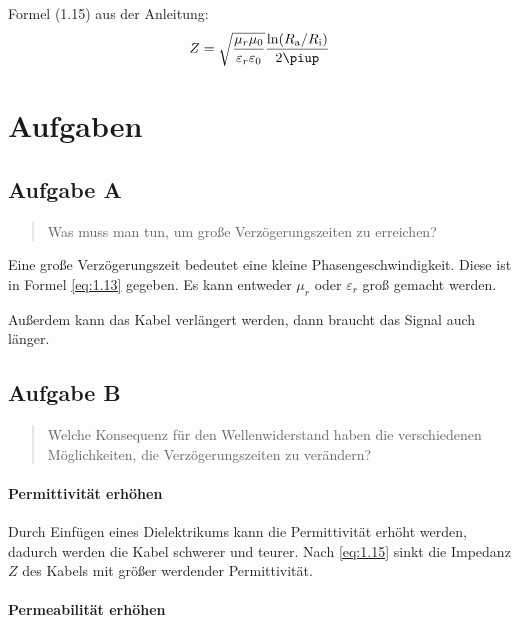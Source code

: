 Formel (1.15) aus der Anleitung:
\begin{equation}
	\label{eq:1.15}
	Z = \sqrt{\frac{\mu_r \mu_0}{\varepsilon_r \varepsilon_0}} \frac{\ln(R_\text a/R_\text i)}{2\piup}
\end{equation}


\section{Aufgaben}

\subsection{Aufgabe A}

\begin{quote}
	Was muss man tun, um große Verzögerungszeiten zu erreichen?
\end{quote}

Eine große Verzögerungszeit bedeutet eine kleine Phasengeschwindigkeit. Diese
ist in Formel \eqref{eq:1.13} gegeben. Es kann entweder $\mu_r$ oder
$\varepsilon_r$ groß gemacht werden.

Außerdem kann das Kabel verlängert werden, dann braucht das Signal auch länger.

\subsection{Aufgabe B}

\begin{quote}
	Welche Konsequenz für den Wellenwiderstand haben die verschiedenen
	Möglichkeiten, die Verzögerungszeiten zu verändern?
\end{quote}

\paragraph{Permittivität erhöhen}

Durch Einfügen eines Dielektrikums kann die Permittivität erhöht werden,
dadurch werden die Kabel schwerer und teurer. Nach \eqref{eq:1.15} sinkt die
Impedanz $Z$ des Kabels mit größer werdender Permittivität.

\paragraph{Permeabilität erhöhen}

